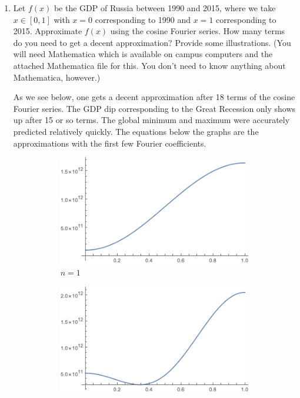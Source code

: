 \documentclass[12pt,letterpaper,reqno]{amsart}
\begin{document}
\begin{enumerate}[1.]
\begin{flushleft}
\newline
\end{flushleft}
\item Let $f(x)$ be the GDP of Russia between 1990 and 2015, where we take $x\in [0,1]$ with $x=0$ corresponding to 1990 and $x=1$ corresponding to 2015. Approximate $f(x)$ using the cosine Fourier series. How many terms do you need to get a decent approximation? Provide some illustrations. (You will need Mathematica which is available on campus computers and the attached Mathematica file for this. You don't need to know anything about Mathematica, however.)\newline
\begin{flushleft}
As we see below, one gets a decent approximation after 18 terms of the cosine Fourier series. The GDP dip corresponding to the Great Recession only shows up after 15 or so terms. The global minimum and maximum were accurately predicted relatively quickly. The equations below the graphs are the approximations with the first few Fourier coefficients.
\end{flushleft}
\begin{figure}[h]
\centering
\begin{subfigure}{.33\textwidth}
  \centering
  \includegraphics[width=.8\linewidth]{./RussiaGDPn1.png}
  \caption*{$n=1$}
\end{subfigure}%
\begin{subfigure}{.33\textwidth}
  \centering
  \includegraphics[width=.8\linewidth]{./RussiaGDPn2.png}

\end{subfigure}
\end{figure}
\end{enumerate}
\end{document}
